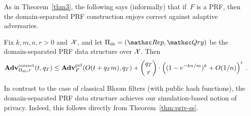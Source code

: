 
 As in Theorem~\ref{thm3}, the following says
(informally) that if~$F$ is a PRF, then the domain-separated PRF
construction enjoys correct against adaptive adversaries.



\begin{theorem}%
\label{thm2}\label{thm:ds-correctness} Fix $k,m,n,r>0$ and~${\cal X}$,
and let $\setprim_{\mathrm{ds}}= (\Rep, \Qry)$ be the
domain-separated PRF data structure over ${\cal X}$. Then
\[
\mathrm{\mathbf{Adv}}^{\mathrm{correct}}_{\Pi_{\mathrm{ds}},r}(t, q_T) \leq  \mathbf{Adv}^{\mathrm{prf}}_{F}(O(t+q_T m), q_T)  + {\dbinom{q_T}{r}} \cdot \left( (1-e^{-kn/m})^k + O(1/n) \right)^r\,.
\]
\end{theorem}





 In contrast to the case of classical Bloom
filters (with public hash functions), the domain-separated PRF data
structure achieves our simulation-based notion of privacy. Indeed,
this follows directly from Theorem~\ref{thm:priv-ss}.

